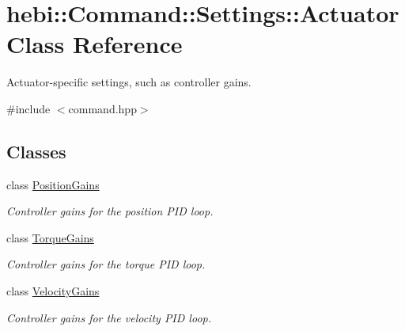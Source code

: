 \hypertarget{classhebi_1_1Command_1_1Settings_1_1Actuator}{}\section{hebi\+:\+:Command\+:\+:Settings\+:\+:Actuator Class Reference}
\label{classhebi_1_1Command_1_1Settings_1_1Actuator}


Actuator-\/specific settings, such as controller gains.  




{\ttfamily \#include $<$command.\+hpp$>$}

\subsection*{Classes}
\begin{DoxyCompactItemize}
\item 
class \hyperlink{classhebi_1_1Command_1_1Settings_1_1Actuator_1_1PositionGains}{Position\+Gains}
\begin{DoxyCompactList}\small\item\em Controller gains for the position P\+ID loop. \end{DoxyCompactList}\item 
class \hyperlink{classhebi_1_1Command_1_1Settings_1_1Actuator_1_1TorqueGains}{Torque\+Gains}
\begin{DoxyCompactList}\small\item\em Controller gains for the torque P\+ID loop. \end{DoxyCompactList}\item 
class \hyperlink{classhebi_1_1Command_1_1Settings_1_1Actuator_1_1VelocityGains}{Velocity\+Gains}
\begin{DoxyCompactList}\small\item\em Controller gains for the velocity P\+ID loop. \end{DoxyCompactList}\end{DoxyCompactItemize}
